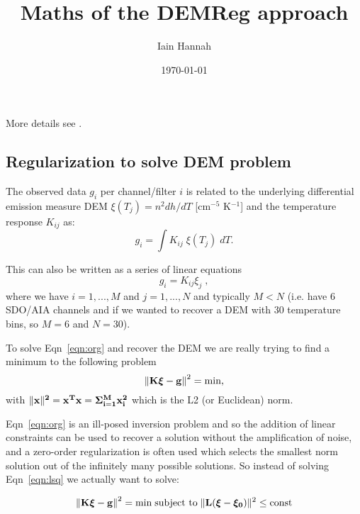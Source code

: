 \documentclass[12pt,a4paper]{article}
\title{Maths of the DEMReg approach}
\author{Iain Hannah}
\date{\today}
\begin{document}
\maketitle\thispagestyle{fancy}

More details see \citet{2012A&A...539A.146H,2013A&A...553A..10H,2004SoPh..225..293K,1992InvPr...8..849H}.

\vspace{-10pt}
\subsection*{Regularization to solve DEM problem}

The observed data $g_i$ per channel/filter $i$ is related to the underlying differential emission measure DEM $\xi(T_j)=n^2 dh/dT$ [cm$^{-5}$ K$^{-1}$] and the temperature response $K_{ij}$ as:
\begin{equation}\label{eqn:org}
    g_i=\int K_{ij}\;\xi(T_j)\; dT.
\end{equation}

This can also be written as a series of linear equations 
\begin{equation}\label{eqn:le}
    g_i=K_{ij}\xi_j\;,
\end{equation}
where we have $i=1,...,M$ and $j=1,...,N$ and typically $M<N$ (i.e. have 6 SDO/AIA channels and if we wanted to recover a DEM with 30 temperature bins, so $M=6$ and $N=30$). 

To solve Eqn~\ref{eqn:org} and recover the DEM we are really trying to find a minimum to the following problem
\begin{equation}\label{eqn:lsq}
    \left\|\bf{K\boldsymbol{\xi}-g}\right\|^2=\mbox{min},
\end{equation}
with $\|\bf{x}\|^2=\bf{x}^T\bf{x}=\Sigma_{i=1}^{M} \bf{x}_i^2$ which is the L2 (or Euclidean) norm. 

Eqn~\ref{eqn:org} is an ill-posed inversion problem and so the addition of linear constraints can be used to recover a solution without the amplification of noise, and a zero-order regularization is often used which selects the smallest norm solution out of the infinitely many possible solutions. So instead of solving Eqn~\ref{eqn:lsq} we actually want to solve:

\begin{equation}
    \left\|\bf{K\boldsymbol{\xi}-g}\right\|^2  =  \mathrm{min}  \;
\mbox{subject to} \; \| {\bf L (\boldsymbol{\xi}-\boldsymbol{\xi_0})}\|^2\le \mathrm{const}
\end{equation}
\end{document}
